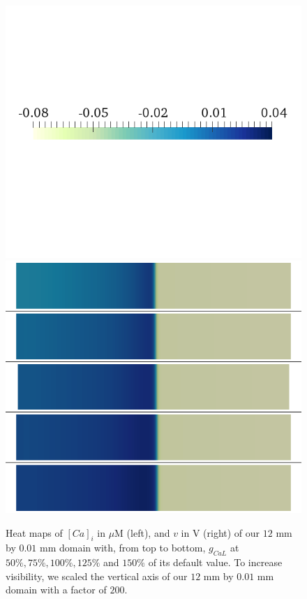 \documentclass[12pt,a4paper]{article}
\begin{document}
\begin{figure}
\begin{minipage}{0.5\textwidth}
\includegraphics[trim=0cm 7cm 0cm 6cm, clip=true, width=1\linewidth]{legend_v2}
\includegraphics[trim=0cm 0cm 0cm 0cm, clip=true, width=1\linewidth]{v_gcal}
    \end{minipage}
    \caption{Heat maps of $[Ca]_i$ in $\mu$M (left), and $v$ in V (right) of our $12$ mm by $0.01$ mm domain with, from top to bottom, $g_{CaL}$ at $50\%, 75\%, 100\%, 125\%$ and $150\%$ of its default value. To increase visibility, we scaled the vertical axis of our $12$ mm by $0.01$ mm domain with a factor of $200$.}
    \label{fig:1b}
\end{figure}
\end{document}
